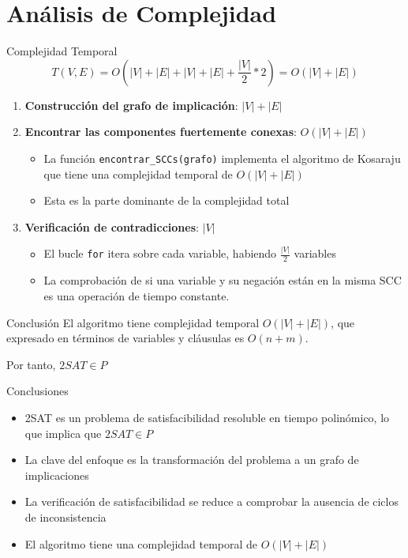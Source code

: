 \documentclass{beamer}
\begin{document}
\section{Análisis de Complejidad}
\begin{frame}{Complejidad Temporal}
\begin{equation*}
T(V, E) = O(|V| + |E| + |V| + |E| + \frac{|V|}{2} * 2) = O(|V| + |E|)
\end{equation*}

\begin{enumerate}
\item \textbf{Construcción del grafo de implicación}: $|V| + |E|$

\item \textbf{Encontrar las componentes fuertemente conexas}: $O(|V| + |E|)$
   \begin{itemize}
   \item La función \texttt{encontrar\_SCCs(grafo)} implementa el algoritmo de Kosaraju que tiene una complejidad temporal de $O(|V| + |E|)$
   \item \alert{Esta es la parte dominante de la complejidad total}
   \end{itemize}
   
\item \textbf{Verificación de contradicciones}: $|V|$
   \begin{itemize}
	\item El bucle \texttt{for} itera sobre cada variable, habiendo $\frac{|V|}{2}$ variables
	\item La comprobación de si una variable y su negación están en la misma SCC es una operación de tiempo constante.
   \end{itemize}
\end{enumerate}

\begin{block}{Conclusión}
El algoritmo tiene complejidad temporal $O(|V| + |E|)$, que expresado en términos de variables y cláusulas es $O(n + m)$.

Por tanto, \alert{$2SAT \in P$}
\end{block}
\end{frame}

\begin{frame}{Conclusiones}
\begin{itemize}
\item 2SAT es un problema de satisfacibilidad resoluble en tiempo polinómico, lo que implica que $2SAT \in P$
\item La clave del enfoque es la transformación del problema a un grafo de implicaciones
\item La verificación de satisfacibilidad se reduce a comprobar la ausencia de ciclos de inconsistencia
\item El algoritmo tiene una complejidad temporal de $O(|V| + |E|)$
\end{itemize}

\end{frame}
\end{document}

